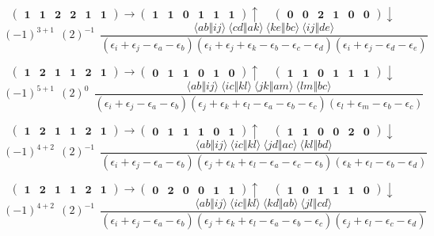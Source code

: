 \documentclass[12pt,oneside,a4paper,fleqn]{article}
\begin{document}
\[ \boldsymbol{ \begin{pmatrix} 1 & 1 & 2 & 2 & 1 & 1 \end{pmatrix} \rightarrow \begin{pmatrix} 1 & 1 & 0 & 1 & 1 & 1 \end{pmatrix} \uparrow~~~~~\begin{pmatrix} 0 & 0 & 2 & 1 & 0 & 0 \end{pmatrix} \downarrow } \]
$$(-1)^{3+1}~~(2)^{-1}~~\frac{\langle ab \Vert ij \rangle ~\langle cd \Vert ak \rangle ~\langle ke \Vert bc \rangle ~\langle ij \Vert de \rangle }{(\epsilon_i +\epsilon_j -\epsilon_a -\epsilon_b ) (\epsilon_i +\epsilon_j +\epsilon_k -\epsilon_b -\epsilon_c -\epsilon_d ) (\epsilon_i +\epsilon_j -\epsilon_d -\epsilon_e ) }$$

\[ \boldsymbol{ \begin{pmatrix} 1 & 2 & 1 & 1 & 2 & 1 \end{pmatrix} \rightarrow \begin{pmatrix} 0 & 1 & 1 & 0 & 1 & 0 \end{pmatrix} \uparrow~~~~~\begin{pmatrix} 1 & 1 & 0 & 1 & 1 & 1 \end{pmatrix} \downarrow } \]
$$(-1)^{5+1}~~(2)^{0}~~\frac{\langle ab \Vert ij \rangle ~\langle ic \Vert kl \rangle ~\langle jk \Vert am \rangle ~\langle lm \Vert bc \rangle }{(\epsilon_i +\epsilon_j -\epsilon_a -\epsilon_b ) (\epsilon_j +\epsilon_k +\epsilon_l -\epsilon_a -\epsilon_b -\epsilon_c ) (\epsilon_l +\epsilon_m -\epsilon_b -\epsilon_c ) }$$

\[ \boldsymbol{ \begin{pmatrix} 1 & 2 & 1 & 1 & 2 & 1 \end{pmatrix} \rightarrow \begin{pmatrix} 0 & 1 & 1 & 1 & 0 & 1 \end{pmatrix} \uparrow~~~~~\begin{pmatrix} 1 & 1 & 0 & 0 & 2 & 0 \end{pmatrix} \downarrow } \]
$$(-1)^{4+2}~~(2)^{-1}~~\frac{\langle ab \Vert ij \rangle ~\langle ic \Vert kl \rangle ~\langle jd \Vert ac \rangle ~\langle kl \Vert bd \rangle }{(\epsilon_i +\epsilon_j -\epsilon_a -\epsilon_b ) (\epsilon_j +\epsilon_k +\epsilon_l -\epsilon_a -\epsilon_c -\epsilon_b ) (\epsilon_k +\epsilon_l -\epsilon_b -\epsilon_d ) }$$

\[ \boldsymbol{ \begin{pmatrix} 1 & 2 & 1 & 1 & 2 & 1 \end{pmatrix} \rightarrow \begin{pmatrix} 0 & 2 & 0 & 0 & 1 & 1 \end{pmatrix} \uparrow~~~~~\begin{pmatrix} 1 & 0 & 1 & 1 & 1 & 0 \end{pmatrix} \downarrow } \]
$$(-1)^{4+2}~~(2)^{-1}~~\frac{\langle ab \Vert ij \rangle ~\langle ic \Vert kl \rangle ~\langle kd \Vert ab \rangle ~\langle jl \Vert cd \rangle }{(\epsilon_i +\epsilon_j -\epsilon_a -\epsilon_b ) (\epsilon_j +\epsilon_k +\epsilon_l -\epsilon_a -\epsilon_b -\epsilon_c ) (\epsilon_j +\epsilon_l -\epsilon_c -\epsilon_d ) }$$
\end{document}
